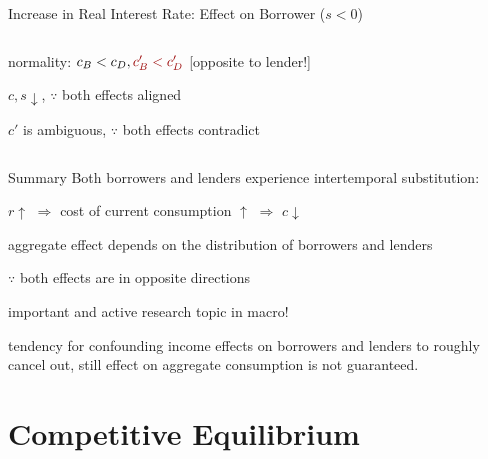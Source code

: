 \documentclass[11pt,aspectratio=169,usenames,dvipsnames]{beamer}
\newcommand{\red}[1]{\textcolor{red}{#1}}
\let\tempone\itemize
\let\temptwo\enditemize
\renewenvironment{itemize}{\tempone\addtolength{\itemsep}{\fill}}{\temptwo}
\begin{document}
\begin{frame}{Increase in Real Interest Rate: Effect on Borrower ($s < 0$)}
\begin{columns}
\begin{column}{0.5\textwidth}
\begin{itemize}
                \begin{itemize}
                    \item normality: $ c_{B} < c_{D}, \red{c'_{B} < c'_{D}} $ [opposite to lender!]
                    \item $ c, s \downarrow $, $ \because $ both effects aligned
                    \item $ c' $ is ambiguous, $ \because $ both effects contradict
                \end{itemize}
            \end{itemize}
        \end{column}
    \end{columns}
\end{frame}

\begin{frame}{Summary}
\label{slide:Summary}
    Both borrowers and lenders experience \alert{intertemporal substitution}:
    \begin{itemize}
        \item $ r \uparrow  $ $ \Rightarrow  $ cost of current consumption $ \uparrow  $ $ \Rightarrow  $ $ c \downarrow  $
        \item aggregate effect depends on the \alert{distribution} of borrowers and lenders
        \begin{itemize}
            \item $ \because $ both effects are in opposite directions
            \item important and active research topic in macro!
        \end{itemize}
        \item tendency for confounding income effects on borrowers and lenders to roughly cancel out, still \alert{effect on aggregate consumption} is not guaranteed.
    \end{itemize}
\end{frame}

\section{Competitive Equilibrium}
\label{sec:Competitive_Equilibrium}
\end{document}
